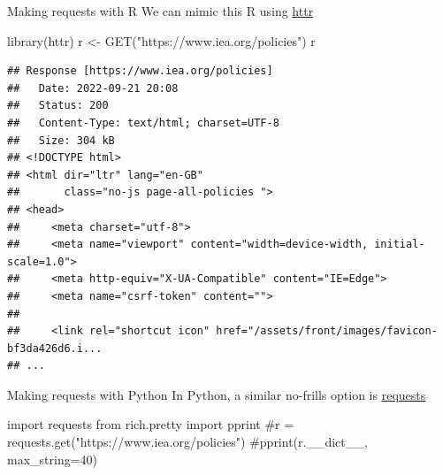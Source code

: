 \documentclass[
  10pt,
  ignorenonframetext,
  aspectratio=169]{beamer}
\newenvironment{Shaded}{\begin{snugshade}}{\end{snugshade}}
\newcommand{\CommentTok}[1]{\textcolor[rgb]{0.50,0.62,0.50}{#1}}
\newcommand{\FunctionTok}[1]{\textcolor[rgb]{0.94,0.94,0.56}{#1}}
\newcommand{\ImportTok}[1]{\textcolor[rgb]{0.80,0.80,0.80}{#1}}
\newcommand{\NormalTok}[1]{\textcolor[rgb]{0.80,0.80,0.80}{#1}}
\newcommand{\OtherTok}[1]{\textcolor[rgb]{0.94,0.94,0.56}{#1}}
\newcommand{\StringTok}[1]{\textcolor[rgb]{0.80,0.58,0.58}{#1}}
\begin{document}
\begin{frame}[fragile]{Making requests with R}
\protect\hypertarget{making-requests-with-r}{}
We can mimic this R using
\href{https://cran.r-project.org/web/packages/httr/vignettes/quickstart.html}{httr}

\scriptsize

\begin{Shaded}
\begin{Highlighting}[]
\FunctionTok{library}\NormalTok{(httr)}
\NormalTok{r }\OtherTok{\textless{}{-}} \FunctionTok{GET}\NormalTok{(}\StringTok{"https://www.iea.org/policies"}\NormalTok{)}
\NormalTok{r}
\end{Highlighting}
\end{Shaded}

\begin{verbatim}
## Response [https://www.iea.org/policies]
##   Date: 2022-09-21 20:08
##   Status: 200
##   Content-Type: text/html; charset=UTF-8
##   Size: 304 kB
## <!DOCTYPE html>
## <html dir="ltr" lang="en-GB"
##       class="no-js page-all-policies ">
## <head>
##     <meta charset="utf-8">
##     <meta name="viewport" content="width=device-width, initial-scale=1.0">
##     <meta http-equiv="X-UA-Compatible" content="IE=Edge">
##     <meta name="csrf-token" content="">
##     
##     <link rel="shortcut icon" href="/assets/front/images/favicon-bf3da426d6.i...
## ...
\end{verbatim}
\end{frame}

\begin{frame}[fragile]{Making requests with Python}
\protect\hypertarget{making-requests-with-python}{}
In Python, a similar no-frills option is
\href{https://requests.readthedocs.io/en/latest/user/quickstart/}{requests}

\scriptsize

\begin{Shaded}
\begin{Highlighting}[]
\ImportTok{import}\NormalTok{ requests}
\ImportTok{from}\NormalTok{ rich.pretty }\ImportTok{import}\NormalTok{ pprint}
\CommentTok{\#r = requests.get("https://www.iea.org/policies")}
\CommentTok{\#pprint(r.\_\_dict\_\_, max\_string=40)}
\end{Highlighting}
\end{Shaded}
\end{frame}
\end{document}
